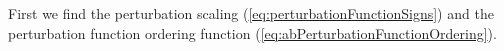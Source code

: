First we find the perturbation scaling (\ref{eq:perturbationFunctionSigns}) and the perturbation function ordering function (\ref{eq:abPerturbationFunctionOrdering}).
